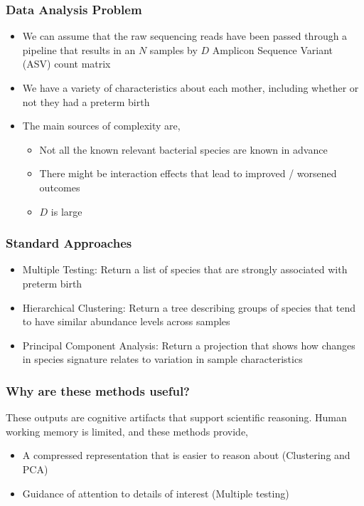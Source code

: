 \documentclass{beamer}
\begin{document}
\begin{frame}
  \frametitle{Data Analysis Problem}
\begin{itemize}
  \item We can assume that the raw sequencing reads have been passed through a
  pipeline that results in an $N$ samples by $D$ Amplicon Sequence Variant (ASV)
  count matrix
  \item We have a variety of characteristics about each mother, including
  whether or not they had a preterm birth
  \item The main sources of complexity are,
  \begin{itemize}
    \item Not all the known relevant bacterial species are known in advance
    \item There might be interaction effects that lead to improved / worsened
    outcomes
    \item $D$ is large
  \end{itemize}
\end{itemize}
\end{frame}
\begin{frame}
  \frametitle{Standard Approaches}
  \begin{itemize}
    \item Multiple Testing: Return a list of species that are strongly
    associated with preterm birth
    \item Hierarchical Clustering: Return a tree describing groups of species
    that tend to have similar abundance levels across samples
    \item Principal Component Analysis: Return a projection that shows how
    changes in species signature relates to variation in sample characteristics
  \end{itemize}
\end{frame}

\begin{frame}
  \frametitle{Why are these methods useful?}
    These outputs are cognitive artifacts that support scientific reasoning.
    Human working memory is limited, and these methods provide,
    \begin{itemize}
      \item A compressed representation that is easier to reason about
      (Clustering and PCA)
      \item Guidance of attention to details of interest (Multiple testing)
  \end{itemize}
\end{frame}
\end{document}
